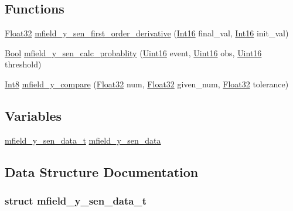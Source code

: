 \subsection*{Functions}
\begin{DoxyCompactItemize}
\item 
\hyperlink{a00072_a87d38f886e617ced2698fc55afa07637}{Float32} \hyperlink{a00026_aaaebfe91a02da9110d1681916a986f34}{mfield\+\_\+y\+\_\+sen\+\_\+first\+\_\+order\+\_\+derivative} (\hyperlink{a00072_a659ce9e5eb6571f9984ffc7caad2660a}{Int16} final\+\_\+val, \hyperlink{a00072_a659ce9e5eb6571f9984ffc7caad2660a}{Int16} init\+\_\+val)
\item 
\hyperlink{a00072_a253b248072cfc8bd812c69acd0046eed}{Bool} \hyperlink{a00026_a4f1d319ccfbf75e0f13a371d55829578}{mfield\+\_\+y\+\_\+sen\+\_\+calc\+\_\+probablity} (\hyperlink{a00072_a59a9f6be4562c327cbfb4f7e8e18f08b}{Uint16} event, \hyperlink{a00072_a59a9f6be4562c327cbfb4f7e8e18f08b}{Uint16} obs, \hyperlink{a00072_a59a9f6be4562c327cbfb4f7e8e18f08b}{Uint16} threshold)
\item 
\hyperlink{a00072_a7e31ca7716b8d85dd473450a5c5e5a97}{Int8} \hyperlink{a00026_a2af9ebe0b13140fee30448427c0df3e5}{mfield\+\_\+y\+\_\+compare} (\hyperlink{a00072_a87d38f886e617ced2698fc55afa07637}{Float32} num, \hyperlink{a00072_a87d38f886e617ced2698fc55afa07637}{Float32} given\+\_\+num, \hyperlink{a00072_a87d38f886e617ced2698fc55afa07637}{Float32} tolerance)
\end{DoxyCompactItemize}
\subsection*{Variables}
\begin{DoxyCompactItemize}
\item 
\hyperlink{a00026_dc/d25/a00596}{mfield\+\_\+y\+\_\+sen\+\_\+data\+\_\+t} \hyperlink{a00026_ac02a1b2761e78fcdcfba8aed32b55c97}{mfield\+\_\+y\+\_\+sen\+\_\+data}
\end{DoxyCompactItemize}


\subsection{Data Structure Documentation}
\label{dc/d25/a00596}
\hypertarget{a00026_dc/d25/a00596}{}
\subsubsection{struct mfield\+\_\+y\+\_\+sen\+\_\+data\+\_\+t}


